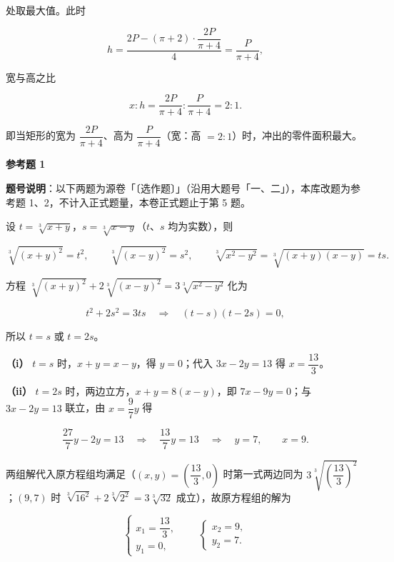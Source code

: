 \begin{answer}
处取最大值。此时

\nopagebreak[4]
\[
h=\frac{2P-(\pi+2)\cdot\dfrac{2P}{\pi+4}}{4}
=\frac{P}{\pi+4},
\]

宽与高之比

\nopagebreak[4]
\[
x:h=\frac{2P}{\pi+4}:\frac{P}{\pi+4}=2:1.
\]

即当矩形的宽为 $\dfrac{2P}{\pi+4}$、高为 $\dfrac{P}{\pi+4}$（宽：高 $=2:1$）时，冲出的零件面积最大。

\textbf{参考题 1}

\begin{gktip}
\textbf{题号说明}：以下两题为源卷「〔选作题〕」（沿用大题号「一、二」），本库改题为参考题 1、2，不计入正式题量，本卷正式题止于第 5 题。
\end{gktip}

设 $t=\sqrt[3]{x+y}$，$s=\sqrt[3]{x-y}$（$t\text{、}s$ 均为实数），则

\nopagebreak[4]
\[
\sqrt[3]{(x+y)^2}=t^2,
\qquad
\sqrt[3]{(x-y)^2}=s^2,
\qquad
\sqrt[3]{x^2-y^2}=\sqrt[3]{(x+y)(x-y)}=ts.
\]

方程 $\sqrt[3]{(x+y)^2}+2\sqrt[3]{(x-y)^2}=3\sqrt[3]{x^2-y^2}$ 化为

\nopagebreak[4]
\[
t^2+2s^2=3ts
\quad\Longrightarrow\quad
(t-s)(t-2s)=0,
\]

所以 $t=s$ 或 $t=2s$。

\textbf{（i）} $t=s$ 时，$x+y=x-y$，得 $y=0$；代入 $3x-2y=13$ 得 $x=\dfrac{13}{3}$。

\textbf{（ii）} $t=2s$ 时，两边立方，$x+y=8(x-y)$，即 $7x-9y=0$；与 $3x-2y=13$ 联立，由 $x=\dfrac97 y$ 得

\nopagebreak[4]
\[
\frac{27}{7}y-2y=13
\quad\Longrightarrow\quad
\frac{13}{7}y=13
\quad\Longrightarrow\quad
y=7,
\qquad
x=9.
\]

两组解代入原方程组均满足（$(x,y)=\left(\dfrac{13}{3},0\right)$ 时第一式两边同为 $3\sqrt[3]{\left(\dfrac{13}{3}\right)^2}$；$(9,7)$ 时 $\sqrt[3]{16^2}+2\sqrt[3]{2^2}=3\sqrt[3]{32}$ 成立），故原方程组的解为

\nopagebreak[4]
\[
\begin{cases}
x_1=\dfrac{13}{3},\\
y_1=0,
\end{cases}
\qquad
\begin{cases}
x_2=9,\\
y_2=7.
\end{cases}
\]


\end{answer}
